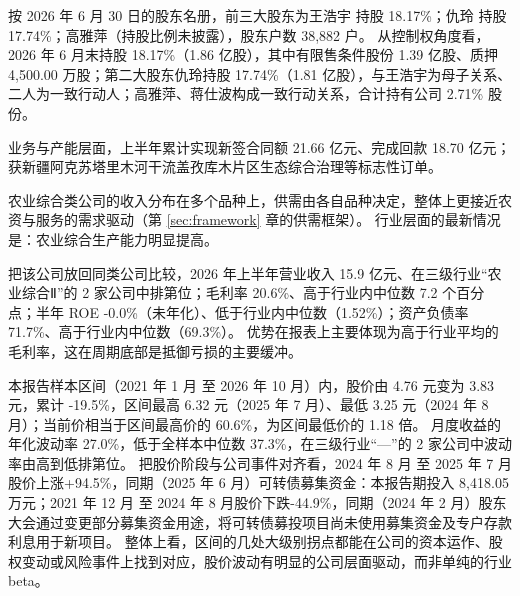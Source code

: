  按 2026 年 6 月 30 日的股东名册，前三大股东为王浩宇 持股 18.17\%；仇玲 持股 17.74\%；高雅萍（持股比例未披露），股东户数 38,882 户。 从控制权角度看，2026 年 6 月末持股 18.17\%（1.86 亿股），其中有限售条件股份 1.39 亿股、质押 4,500.00 万股；第二大股东仇玲持股 17.74\%（1.81 亿股），与王浩宇为母子关系、二人为一致行动人；高雅萍、蒋仕波构成一致行动关系，合计持有公司 2.71\% 股份。

 业务与产能层面，上半年累计实现新签合同额 21.66 亿元、完成回款 18.70 亿元；获新疆阿克苏塔里木河干流盖孜库木片区生态综合治理等标志性订单。

 农业综合类公司的收入分布在多个品种上，供需由各自品种决定，整体上更接近农资与服务的需求驱动（第 \ref{sec:framework} 章的供需框架）。 行业层面的最新情况是：农业综合生产能力明显提高。

 把该公司放回同类公司比较，2026 年上半年营业收入 15.9 亿元、在三级行业“农业综合Ⅱ”的 2 家公司中排第位；毛利率 20.6\%、高于行业内中位数 7.2 个百分点；半年 ROE -0.0\%（未年化）、低于行业内中位数（1.52\%）；资产负债率 71.7\%、高于行业内中位数（69.3\%）。 优势在报表上主要体现为高于行业平均的毛利率，这在周期底部是抵御亏损的主要缓冲。

 本报告样本区间（2021 年 1 月 至 2026 年 10 月）内，股价由 4.76 元变为 3.83 元，累计 -19.5\%，区间最高 6.32 元（2025 年 7 月）、最低 3.25 元（2024 年 8 月）；当前价相当于区间最高价的 60.6\%，为区间最低价的 1.18 倍。 月度收益的年化波动率 27.0\%，低于全样本中位数 37.3\%，在三级行业“—”的 2 家公司中波动率由高到低排第位。 把股价阶段与公司事件对齐看，2024 年 8 月 至 2025 年 7 月股价上涨+94.5\%，同期（2025 年 6 月）可转债募集资金：本报告期投入 8,418.05 万元；2021 年 12 月 至 2024 年 8 月股价下跌-44.9\%，同期（2024 年 2 月）股东大会通过变更部分募集资金用途，将可转债募投项目尚未使用募集资金及专户存款利息用于新项目。 整体上看，区间的几处大级别拐点都能在公司的资本运作、股权变动或风险事件上找到对应，股价波动有明显的公司层面驱动，而非单纯的行业 beta。

